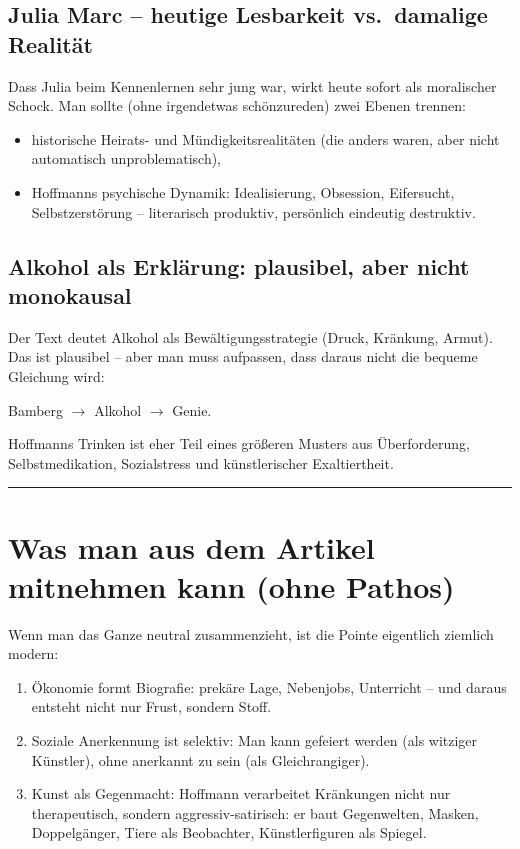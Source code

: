 \documentclass[11pt]{amsart}
\begin{document}
\subsection{Julia Marc -- heutige Lesbarkeit vs.\ damalige Realit\"at}
Dass Julia beim Kennenlernen sehr jung war, wirkt heute sofort als moralischer Schock. Man sollte (ohne irgendetwas sch\"onzureden) zwei Ebenen trennen:
\begin{itemize}
  \item historische Heirats- und M\"undigkeitsrealit\"aten (die anders waren, aber nicht automatisch \glqq unproblematisch\grqq),
  \item Hoffmanns psychische Dynamik: Idealisierung, Obsession, Eifersucht, Selbstzerst\"orung -- literarisch produktiv, pers\"onlich eindeutig destruktiv.
\end{itemize}

\subsection{Alkohol als Erkl\"arung: plausibel, aber nicht monokausal}
Der Text deutet Alkohol als Bew\"altigungsstrategie (Druck, Kr\"ankung, Armut). Das ist plausibel -- aber man muss aufpassen, dass daraus nicht die bequeme Gleichung wird:
\begin{center}
Bamberg $\rightarrow$ Alkohol $\rightarrow$ Genie.
\end{center}
Hoffmanns Trinken ist eher Teil eines gr\"o{\ss}eren Musters aus \"Uberforderung, Selbstmedikation, Sozialstress und k\"unstlerischer Exaltiertheit.

\bigskip
\hrule
\bigskip

\section{Was man aus dem Artikel mitnehmen kann (ohne Pathos)}
Wenn man das Ganze neutral zusammenzieht, ist die Pointe eigentlich ziemlich modern:
\begin{enumerate}
  \item \"Okonomie formt Biografie: prek\"are Lage, Nebenjobs, Unterricht -- und daraus entsteht nicht nur Frust, sondern Stoff.
  \item Soziale Anerkennung ist selektiv: Man kann \glqq gefeiert\grqq{} werden (als witziger K\"unstler), ohne \glqq anerkannt\grqq{} zu sein (als Gleichrangiger).
  \item Kunst als Gegenmacht: Hoffmann verarbeitet Kr\"ankungen nicht nur therapeutisch, sondern aggressiv-satirisch: er baut Gegenwelten, Masken, Doppelg\"anger, Tiere als Beobachter, \glqq K\"unstlerfiguren\grqq{} als Spiegel.
\end{enumerate}
\end{document}
